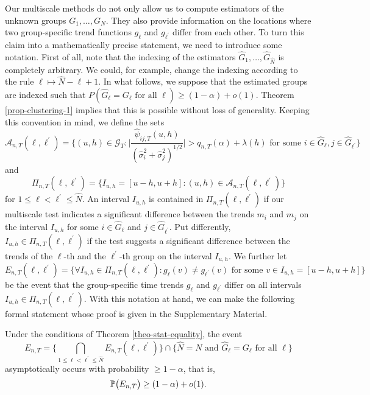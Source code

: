 Our multiscale methods do not only allow us to compute estimators of the unknown groups $G_1,\ldots,G_N$. They also provide information on the locations where two group-specific trend functions $g_\ell$ and $g_{\ell^\prime}$ differ from each other. To turn this claim into a mathematically precise statement, we need to introduce some notation. First of all, note that the indexing of the estimators $\widehat{G}_1,\ldots,\widehat{G}_{\widehat{N}}$ is completely arbitrary. We could, for example, change the indexing according to the rule $\ell \mapsto \widehat{N} - \ell + 1$. In what follows, we suppose that the estimated groups are indexed such that $P( \widehat{G}_\ell = G_\ell \text{ for all } \ell ) \ge (1-\alpha) + o(1)$. Theorem \ref{prop-clustering-1} implies that this is possible without loss of generality. Keeping this convention in mind, we define the sets 
\[ \mathcal{A}_{n,T}(\ell,\ell^\prime) = \Big\{ (u,h) \in \mathcal{G}_T: \Big| \frac{\widehat{\psi}_{ij,T}(u,h)}{(\widehat{\sigma}_i^2 + \widehat{\sigma}_j^2)^{1/2}} \Big| > q_{n,T}(\alpha) + \lambda(h) \text{ for some } i \in \widehat{G}_\ell, j \in \widehat{G}_{\ell^\prime} \Big\} \] 
and  
\[ \Pi_{n,T}(\ell,\ell^\prime) = \big\{ I_{u,h} = [u-h,u+h]: (u,h) \in \mathcal{A}_{n,T}(\ell,\ell^\prime) \big\} \]
for $1 \le \ell < \ell^\prime \le \widehat{N}$. An interval $I_{u,h}$ is contained in $\Pi_{n,T}(\ell,\ell^\prime)$ if our multiscale test indicates a significant difference between the trends $m_i$ and $m_j$ on the interval $I_{u,h}$ for some $i \in \widehat{G}_\ell$ and $j \in \widehat{G}_{\ell^\prime}$. Put differently,  $I_{u,h} \in \Pi_{n,T}(\ell,\ell^\prime)$ if the test suggests a significant difference between the trends of the $\ell$-th and the $\ell^\prime$-th group on the interval $I_{u,h}$. We further let
\[ E_{n,T}(\ell,\ell^\prime) = \Big\{ \forall I_{u,h} \in \Pi_{n,T}(\ell,\ell^\prime): g_\ell(v) \ne g_{\ell^\prime}(v) \text{ for some } v \in I_{u,h} = [u-h,u+h] \Big\} \]
be the event that the group-specific time trends $g_\ell$ and $g_{\ell^\prime}$ differ on all intervals $I_{u,h} \in \Pi_{n,T}(\ell,\ell^\prime)$. With this notation at hand, we can make the following formal statement whose proof is given in the Supplementary Material.
\begin{prop}\label{prop-clustering-2}
Under the conditions of Theorem \ref{theo-stat-equality}, the event 
\[ E_{n,T} = \Big\{ \bigcap_{1 \le \ell < \ell^\prime \le \widehat{N}} E_{n,T}(\ell,\ell^\prime) \Big\} \cap \Big\{ \widehat{N} = N \text{ and } \widehat{G}_\ell = G_\ell \text{ for all } \ell \Big\} \]
asymptotically occurs with probability $\ge 1-\alpha$, that is, 
\[ \mathbb{P} \big( E_{n,T} \big) \ge (1 - \alpha) + o(1). \]
\end{prop}
